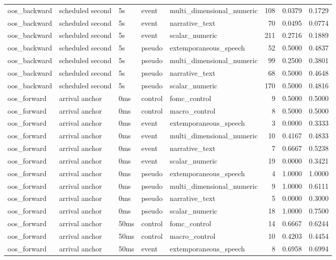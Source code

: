 \begin{tabular}{lllllrrr}
oos_backward & scheduled second & 5s & event & multi_dimensional_numeric & 108 & 0.0379 & 0.1729 \\
oos_backward & scheduled second & 5s & event & narrative_text & 70 & 0.0495 & 0.0774 \\
oos_backward & scheduled second & 5s & event & scalar_numeric & 211 & 0.2716 & 0.1889 \\
oos_backward & scheduled second & 5s & pseudo & extemporaneous_speech & 52 & 0.5000 & 0.4837 \\
oos_backward & scheduled second & 5s & pseudo & multi_dimensional_numeric & 99 & 0.2500 & 0.3801 \\
oos_backward & scheduled second & 5s & pseudo & narrative_text & 68 & 0.5000 & 0.4648 \\
oos_backward & scheduled second & 5s & pseudo & scalar_numeric & 170 & 0.5000 & 0.4816 \\
oos_forward & arrival anchor & 0ms & control & fomc_control & 9 & 0.5000 & 0.5000 \\
oos_forward & arrival anchor & 0ms & control & macro_control & 8 & 0.5000 & 0.5000 \\
oos_forward & arrival anchor & 0ms & event & extemporaneous_speech & 3 & 0.0000 & 0.3333 \\
oos_forward & arrival anchor & 0ms & event & multi_dimensional_numeric & 10 & 0.4167 & 0.4833 \\
oos_forward & arrival anchor & 0ms & event & narrative_text & 7 & 0.6667 & 0.5238 \\
oos_forward & arrival anchor & 0ms & event & scalar_numeric & 19 & 0.0000 & 0.3421 \\
oos_forward & arrival anchor & 0ms & pseudo & extemporaneous_speech & 4 & 1.0000 & 1.0000 \\
oos_forward & arrival anchor & 0ms & pseudo & multi_dimensional_numeric & 9 & 1.0000 & 0.6111 \\
oos_forward & arrival anchor & 0ms & pseudo & narrative_text & 5 & 0.0000 & 0.3000 \\
oos_forward & arrival anchor & 0ms & pseudo & scalar_numeric & 18 & 1.0000 & 0.7500 \\
oos_forward & arrival anchor & 50ms & control & fomc_control & 14 & 0.6667 & 0.6244 \\
oos_forward & arrival anchor & 50ms & control & macro_control & 10 & 0.4203 & 0.4454 \\
oos_forward & arrival anchor & 50ms & event & extemporaneous_speech & 8 & 0.6958 & 0.6994 \\

\end{tabular}

